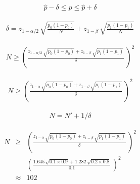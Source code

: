 \documentclass[12pt]{article}
\begin{document}
 
\pagestyle{empty} 
\Large 
{}
\pagecolor{ehandbook}

\boldmath


\begin{eqnarray*}
\hat{p} - \delta \le p \le \hat{p} + \delta
\end{eqnarray*}

\hspace*{.25in}
 
\begin{eqnarray*}
\delta = z_{1-\alpha/2} \, \sqrt{\frac{p_0 (1-p_0)}{N}} + z_{1-\beta} \, \sqrt{\frac{p_1 (1-p_1)}{N}}
\end{eqnarray*}

\hspace*{.25in}

\begin{eqnarray*}
N \ge  \left( \frac{z_{1-\alpha/2} \, \sqrt{p_0 (1-p_0)} + z_{1-\beta} \, \sqrt{p_1 (1-p_1)}}{\delta} \, \right)^2
\end{eqnarray*}

\hspace*{.25in}

\begin{eqnarray*}
N \ge  \left( \frac{z_{1-\alpha} \, \sqrt{p_0 (1-p_0)} + z_{1-\beta} \, \sqrt{p_1 (1-p_1)}}{\delta} \, \right)^2
\end{eqnarray*}

\hspace*{1in}

\vspace*{-.5in}

\begin{eqnarray*}
N = N' + 1/\delta
\end{eqnarray*}

\hspace*{.25in}

\begin{eqnarray*}
N & \ge & \left( \frac{z_{1-\alpha} \, \sqrt{p_0 (1-p_0)} + z_{1-\beta} \, \sqrt{p_1 (1-p_1)}}{\delta} \, \right)^2 \\
   &       & \left( \frac{1.645 \, \sqrt{0.1 \times 0.9} + 1.282 \, \sqrt{0.2 \times 0.8}}{0.1} \, \right)^2 \\
   & \approx & 102
\end{eqnarray*}
\end{document}
